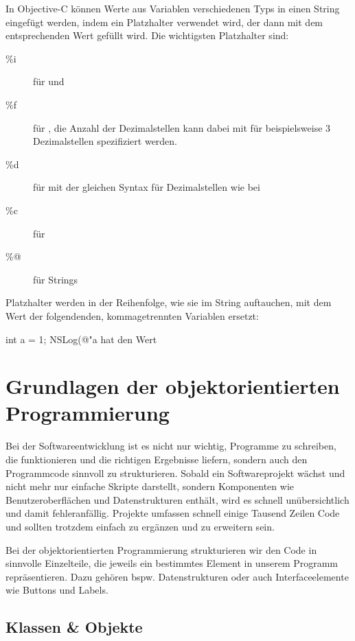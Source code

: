\documentclass[parskip=half, final]{scrreprt}
\begin{document}
In Objective-C können Werte aus Variablen verschiedenen Typs in einen String eingefügt werden, indem ein Platzhalter verwendet wird, der dann mit dem entsprechenden Wert gefüllt wird. Die wichtigsten Platzhalter sind:
\begin{description}
\item[\%i] für  und 
\item[\%f] für , die Anzahl der Dezimalstellen kann dabei mit  für beispielsweise 3 Dezimalstellen spezifiziert werden.
\item[\%d] für  mit der gleichen Syntax für Dezimalstellen wie bei 
\item[\%c] für 
\item[\%@] für Strings
\end{description}

Platzhalter werden in der Reihenfolge, wie sie im String auftauchen, mit dem Wert der folgendenden, kommagetrennten Variablen ersetzt:
\begin{objclst}
int a = 1;
NSLog(@"a hat den Wert %
\end{objclst}


\section{Grundlagen der objektorientierten Programmierung}

Bei der Softwareentwicklung ist es nicht nur wichtig, Programme zu schreiben, die funktionieren und die richtigen Ergebnisse liefern, sondern auch den Programmcode sinnvoll zu strukturieren. Sobald ein Softwareprojekt wächst und nicht mehr nur einfache Skripte darstellt, sondern Komponenten wie Benutzeroberflächen und Datenstrukturen enthält, wird es schnell unübersichtlich und damit fehleranfällig. Projekte umfassen schnell einige Tausend Zeilen Code und sollten trotzdem einfach zu ergänzen und zu erweitern sein.

Bei der objektorientierten Programmierung strukturieren wir den Code in sinnvolle Einzelteile, die jeweils ein bestimmtes Element in unserem Programm repräsentieren. Dazu gehören bspw. Datenstrukturen oder auch Interfaceelemente wie Buttons und Labels.

\subsection{Klassen \& Objekte}\label{sec:klassenobjekte}
\end{document}
